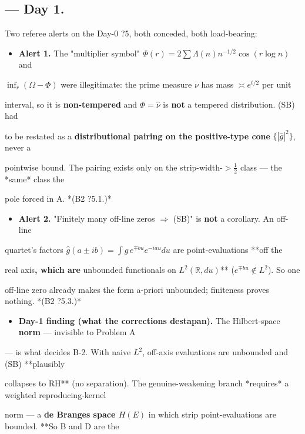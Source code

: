 \documentclass[10pt]{article}
\begin{document}
\subsection*{ --- Day 1.}
Two referee alerts on the Day-0 ?5, both conceded, both load-bearing:\par
\begin{itemize}
\item \textbf{Alert 1.} The "multiplier symbol" $\Phi(r)=2\sum\Lambda(n)n^{-1/2}\cos(r\log n)$ and
\end{itemize}
  $\inf_r(\Omega-\Phi)$ were illegitimate: the prime measure $\nu$ has mass $\asymp e^{t/2}$ per unit\par
  interval, so it is \textbf{non-tempered} and $\Phi=\widehat\nu$ is \textbf{not} a tempered distribution. (SB) had\par
  to be restated as a \textbf{distributional pairing on the positive-type cone} $\{|\widehat g|^2\}$, never a\par
  pointwise bound. The pairing exists only on the strip-width-$>\tfrac12$ class --- the *same* class the\par
  pole forced in A. *(B2 ?5.1.)*\par
\begin{itemize}
\item \textbf{Alert 2.} "Finitely many off-line zeros $\Rightarrow$ (SB)" is \textbf{not} a corollary. An off-line
\end{itemize}
  quartet's factors $\widehat g(a\pm ib)=\int g\,e^{\mp bu}e^{-iau}du$ are point-evaluations **off the\par
  real axis\textbf{, which are }unbounded functionals on $L^2(\mathbb R,du)$** ($e^{\mp bu}\notin L^2$). So one\par
  off-line zero already makes the form a-priori unbounded; finiteness proves nothing. *(B2 ?5.3.)*\par
\begin{itemize}
\item \textbf{Day-1 finding (what the corrections destapan).} The Hilbert-space \textbf{norm} --- invisible to Problem A
\end{itemize}
  --- is what decides B-2. With naive $L^2$, off-axis evaluations are unbounded and (SB) **plausibly\par
  collapses to RH** (no separation). The genuine-weakening branch *requires* a weighted reproducing-kernel\par
  norm --- a \textbf{de Branges space $H(E)$} in which strip point-evaluations are bounded. **So B and D are the\par
\end{document}
